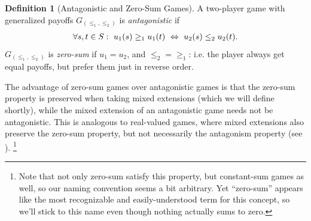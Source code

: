 \documentclass[a4paper]{scrreprt}
\theoremstyle{definition}
\newtheorem{defn}[thm]{Definition} %
\begin{document}
    \begin{defn}[Antagonistic and Zero-Sum Games]
        A two-player game with generalized payoffs $G_{(\leq_1, \leq_2)}$ is \emph{antagonistic} if
        \begin{gather*}
            \forall s, t \in S:~ u_1(s) \geq_1 u_1(t) ~\Leftrightarrow~ u_2(s) \leq_2 u_2(t).
        \end{gather*}
        $G_{(\leq_1, \leq_2)}$ is \emph{zero-sum} if $u_1 = u_2$, and $\leq_2 {=} \geq_1$: i.e. the player always get equal payoffs, but prefer them just in reverse order.
        \label{def:zeroSumGeneralizedPayoffs}
    \end{defn}
    
    The advantage of zero-sum games over antagonistic games is that the zero-sum property is preserved when taking mixed extensions (which we will define shortly), while the mixed extension of an antagonistic game needs not be antagonistic. 
    This is analogous to real-valued games, where mixed extensions also preserve the zero-sum property, but not necessarily the antagonism property (see \cite{bib:andersonAntagonisticGames}).
    \footnote{Note that not only zero-sum satisfy this property, but constant-sum games as well, so our naming convention seems a bit arbitrary.
        Yet “zero-sum” appears like the most recognizable and easily-understood term for this concept, so we'll stick to this name even though nothing actually sums to zero.}
    
\end{document}
